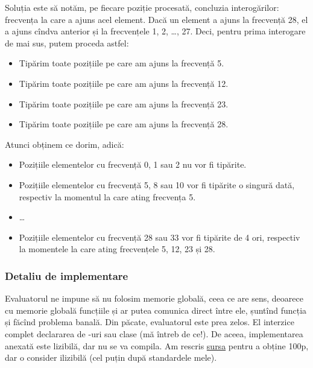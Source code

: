 Soluția este să notăm, pe fiecare poziție procesată, concluzia interogărilor: frecvența la care a ajuns acel element. Dacă un element a ajuns la frecvență 28, el a ajuns cîndva anterior și la frecvențele 1, 2, \dots, 27. Deci, pentru prima interogare de mai sus, putem proceda astfel:

\begin{itemize}
  \item Tipărim toate pozițiile pe care am ajuns la frecvență 5.
  \item Tipărim toate pozițiile pe care am ajuns la frecvență 12.
  \item Tipărim toate pozițiile pe care am ajuns la frecvență 23.
  \item Tipărim toate pozițiile pe care am ajuns la frecvență 28.
\end{itemize}

Atunci obținem ce dorim, adică:

\begin{itemize}
  \item Pozițiile elementelor cu frecvență 0, 1 sau 2 nu vor fi tipărite.

  \item Pozițiile elementelor cu frecvență 5, 8 sau 10 vor fi tipărite o singură dată, respectiv la momentul la care ating frecvența 5.

  \item \dots

  \item Pozițiile elementelor cu frecvență 28 sau 33 vor fi tipărite de 4 ori, respectiv la momentele la care ating frecvențele 5, 12, 23 și 28.
\end{itemize}

\subsubsection*{Detaliu de implementare}

Evaluatorul ne impune să nu folosim memorie globală, ceea ce are sens, deoarece cu memorie globală funcțiile  și  ar putea comunica direct între ele, șuntînd funcția  și făcînd problema banală. Din păcate, evaluatorul este prea zelos. El interzice complet declararea de -uri sau clase (mă întreb de ce!). De aceea, implementarea anexată este lizibilă, dar nu se va compila. Am rescris \href{https://kilonova.ro/submissions/772576}{sursa} pentru a obține 100p, dar o consider ilizibilă (cel puțin după standardele mele).


